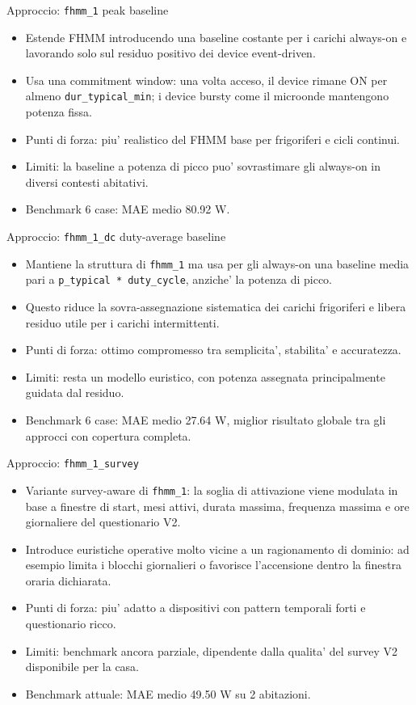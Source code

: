 \documentclass[aspectratio=169]{beamer}
\newcommand{\code}[1]{\texttt{#1}}
\begin{document}
\begin{frame}{Approccio: \code{fhmm\_1} peak baseline}
\small
\begin{itemize}
  \item Estende FHMM introducendo una baseline costante per i carichi always-on e lavorando solo sul residuo positivo dei device event-driven.
  \item Usa una commitment window: una volta acceso, il device rimane ON per almeno \code{dur\_typical\_min}; i device bursty come il microonde mantengono potenza fissa.
  \item Punti di forza: piu' realistico del FHMM base per frigoriferi e cicli continui.
  \item Limiti: la baseline a potenza di picco puo' sovrastimare gli always-on in diversi contesti abitativi.
  \item Benchmark 6 case: MAE medio 80.92 W.
\end{itemize}
\end{frame}

\begin{frame}{Approccio: \code{fhmm\_1\_dc} duty-average baseline}
\small
\begin{itemize}
  \item Mantiene la struttura di \code{fhmm\_1} ma usa per gli always-on una baseline media pari a \code{p\_typical * duty\_cycle}, anziche' la potenza di picco.
  \item Questo riduce la sovra-assegnazione sistematica dei carichi frigoriferi e libera residuo utile per i carichi intermittenti.
  \item Punti di forza: ottimo compromesso tra semplicita', stabilita' e accuratezza.
  \item Limiti: resta un modello euristico, con potenza assegnata principalmente guidata dal residuo.
  \item Benchmark 6 case: MAE medio 27.64 W, miglior risultato globale tra gli approcci con copertura completa.
\end{itemize}
\end{frame}

\begin{frame}{Approccio: \code{fhmm\_1\_survey}}
\small
\begin{itemize}
  \item Variante survey-aware di \code{fhmm\_1}: la soglia di attivazione viene modulata in base a finestre di start, mesi attivi, durata massima, frequenza massima e ore giornaliere del questionario V2.
  \item Introduce euristiche operative molto vicine a un ragionamento di dominio: ad esempio limita i blocchi giornalieri o favorisce l'accensione dentro la finestra oraria dichiarata.
  \item Punti di forza: piu' adatto a dispositivi con pattern temporali forti e questionario ricco.
  \item Limiti: benchmark ancora parziale, dipendente dalla qualita' del survey V2 disponibile per la casa.
  \item Benchmark attuale: MAE medio 49.50 W su 2 abitazioni.
\end{itemize}
\end{frame}
\end{document}
